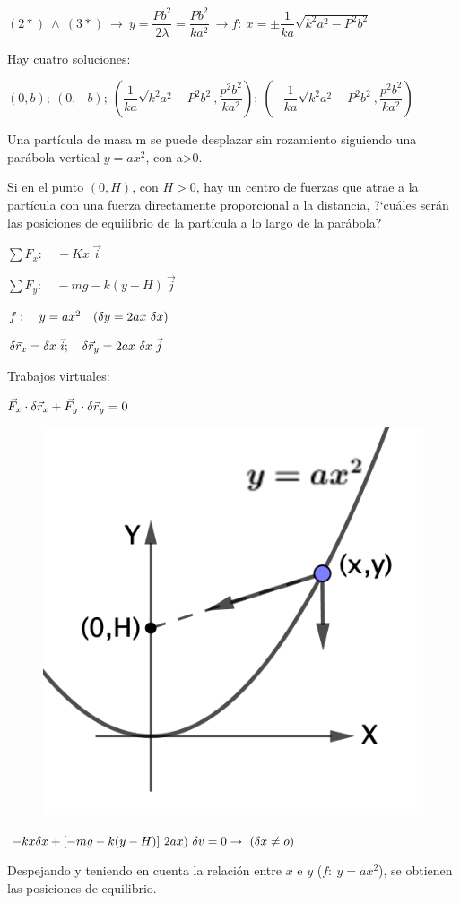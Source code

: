 $(2*) \ \wedge \ (3*)\ \to \ y=\dfrac{Pb^2}{2\lambda}=\dfrac{Pb^2}{ka^2} \ \to f: \ x=\pm \dfrac 1{ka}\sqrt{k^2a^2-P^2b^2}$

Hay cuatro soluciones:

$(0,b);\ (0,-b);\ \left(\dfrac 1{ka}\sqrt{k^2a^2-P^2b^2},\dfrac{p^2b^2}{ka^2} \right);\ \left(-\dfrac 1{ka}\sqrt{k^2a^2-P^2b^2},\dfrac{p^2b^2}{ka^2} \right) $

\begin{prob}
	Una partícula de masa m se puede desplazar sin rozamiento siguiendo una parábola vertical $y=ax^2$, con a>0.
	
	Si en el punto $(0,H)$, con $H>0$, hay un centro de fuerzas que atrae a la partícula con una fuerza directamente proporcional a la distancia, ?`cuáles serán las posiciones de equilibrio de la partícula a lo largo de la parábola?
\end{prob}

\begin{multicols}{2}
$\sum F_x:\quad -Kx\ \vec i$

$\sum F_y:\quad -mg-k(y-H)\ \vec j$

$f:\quad y=ax^2 \quad (\var y= 2ax\ \var x)$

$\var \vec r_x=\var x\ \vec i;\quad \var \vec r_y=2ax\ \var x \ \vec j$

Trabajos virtuales:

$\vec F_x \cdot \var \vec r_x + \vec F_y \cdot \var \vec r_y=0$
\begin{figure}[H]
	\centering
	\includegraphics[width=.4\textwidth]{imagenes/imagenes06/T06IM12.png}
\end{figure}
\end{multicols}
$-kx \var x+ [-mg-k(y-H)]\ 2ax)\ \var v=0 \to \ (\var x \neq o)$

Despejando y teniendo en cuenta la relación entre $x$ e $y$ ($f:\ y=ax^2$), se obtienen las posiciones de equilibrio.

\rightline{\textsf{\textcolor{DarkBlue}{--- Inacabado ---}}}



